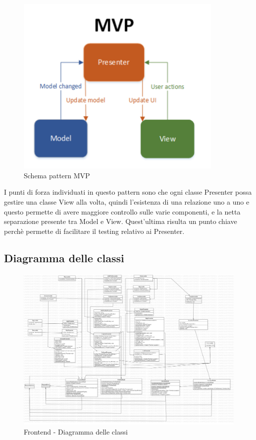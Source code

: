 \begin{figure}[!h]
    \includegraphics[width=10cm]{sezioni/images/mvp.png}
    \centering
    \caption{Schema pattern MVP}
\end{figure}
\aCapo{}
I punti di forza individuati in questo pattern sono che ogni classe Presenter possa gestire 
una classe View alla volta, quindi l'esistenza di una relazione uno a uno e questo permette di avere maggiore 
controllo sulle varie componenti, e la netta separazione presente tra Model e View. 
Quest'ultima risulta un punto chiave perchè permette di facilitare il testing relativo ai Presenter.

\subsection{Diagramma delle classi}
\begin{figure}[!h]
    \includegraphics[width=16cm]{sezioni/images/Main.jpg}
    \centering
    \caption{Frontend - Diagramma delle classi}
\end{figure}

